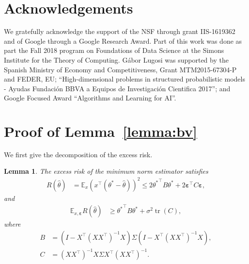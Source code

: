 \documentclass[11pt,notitlepage]{article}
\newcommand\E {\mathbb{E}}
\newcommand\Expect{\E}
\newcommand\bs {\boldsymbol}
\newcommand\eps {\varepsilon}
\newcommand\tr {\ensuremath{\operatorname{\mathrm{tr}}}}
\newtheorem{lemma}[theorem]{Lemma}
\begin{document}
\section*{Acknowledgements}

We gratefully acknowledge the support of the NSF through grant
IIS-1619362 and of Google through a Google Research Award.  Part of
this work was done as part the Fall 2018 program on Foundations of
Data Science at the Simons Institute for the Theory of Computing.
G\'abor Lugosi was supported by the Spanish Ministry of Economy and
Competitiveness, Grant MTM2015-67304-P and FEDER, EU;
``High-dimensional problems in structured probabilistic models -
Ayudas Fundaci\'on BBVA a Equipos de Investigaci\'on Cientifica
2017''; and Google Focused Award ``Algorithms and Learning for AI''.




\appendix

\section{Proof of Lemma~\ref{lemma:bv}}\label{appendix:bias}

We first give the decomposition of the excess risk.

\begin{lemma}
\label{l:bias.variance}
  The excess risk of the minimum norm estimator satisfies
    \begin{align*}
      R(\hat\theta)
        & = \E_{x} \left(x^\top\left(\theta^*-\hat\theta\right)\right)^2
        \leq 2{\theta^\ast}^\top B \theta^\ast +2\bs{\eps}^\top
        C\bs{\eps},
    \end{align*}
  and
    \begin{align*}
      \Expect_{x,\bs{\eps}} R(\hat\theta)
        & \geq {\theta^\ast}^\top B \theta^\ast + \sigma^2 \tr(C),
    \end{align*}
  where
    \begin{align*}
      B & = \left(I - X^\top \left(X X^\top \right)^{-1}X\right)
          \Sigma\left(I - X^\top \left(X X^\top \right)^{-1}X\right), \\
      C & = \left(X X^\top \right)^{-1}X\Sigma X^\top \left(X X^\top \right)^{-1}.
    \end{align*}
\end{lemma}
\end{document}
